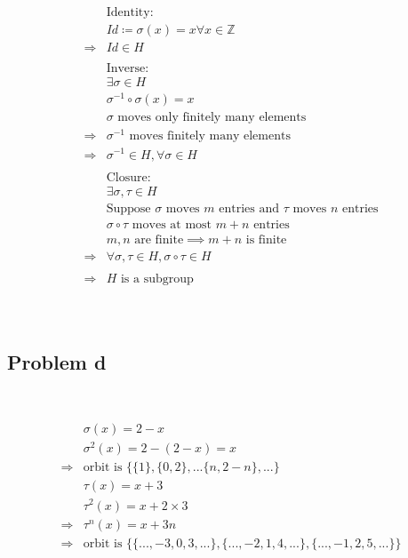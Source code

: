 \documentclass{article}
\begin{document}
\begin{equation*}
    \begin{split}
        &\text{Identity}:\\
        &Id\coloneqq \sigma(x)=x\forall x\in \mathbb{Z} \\
        \Rightarrow&Id\in H\\
        &\\
        &\text{Inverse}:\\
        &\exists \sigma\in H\\
        &\sigma^{-1}\circ\sigma(x)=x\\
        &\sigma\text{ moves only finitely many elements}\\
        \Rightarrow&\sigma^{-1}\text{ moves finitely many elements}\\
        \Rightarrow&\sigma^{-1}\in H,\forall \sigma\in H\\
        &\\
        &\text{Closure}:\\
        &\exists \sigma,\tau\in H\\
        &\text{Suppose }\sigma\text{ moves }m\text{ entries and }\tau\text{ moves }n\text{ entries}\\
        &\sigma\circ \tau\text{ moves at most }m+n\text{ entries}\\
        &m,n\text{ are finite}\implies m+n\text{ is finite}\\
        \Rightarrow&\forall \sigma,\tau \in H,\sigma\circ\tau \in H\\
        &\\
        \Rightarrow&H\text{ is a subgroup}\\
    \end{split}
\end{equation*}

~

\subsection*{Problem d}

~

\begin{equation*}
    \begin{split}
        &\sigma(x)=2-x\\
        &\sigma^2(x)=2-(2-x)=x\\
        \Rightarrow&\text{orbit is }\{\{1\},\{0,2\},...\{n,2-n\},...\}\\
        &\tau(x)=x+3\\
        &\tau^2(x)=x+2\times3\\
        \Rightarrow&\tau^n(x)=x+3n\\
        \Rightarrow&\text{orbit is }\{\{...,-3,0,3,...\},\{...,-2,1,4,...\},\{...,-1,2,5,...\}\}\\
    \end{split}
\end{equation*}
\end{document}
